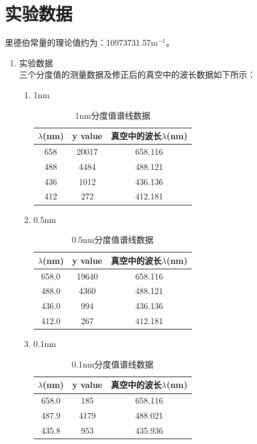 \documentclass[a4paper]{article}
\begin{document}
\section{实验数据}
里德伯常量的理论值约为：10973731.57$\text{m}^{-1}$。
\begin{enumerate}
\item 实验数据\\
三个分度值的测量数据及修正后的真空中的波长数据如下所示：
\begin{enumerate}
\item 1nm
\begin{table}[!h]
\centering
\caption{1nm分度值谱线数据}
\label{table_1nm}
\begin{tabular}{|c|c|c|}
\hline
$\lambda$(nm) & y value & 真空中的波长$\lambda$(nm) \\ \hline
658           & 20017   & 658.116 \\ \hline
488           & 4484    & 488.121 \\ \hline
436           & 1012    & 436.136 \\ \hline
412           & 272     & 412.181 \\ \hline
\end{tabular}
\end{table}
\item 0.5nm
\begin{table}[!h]
\centering
\caption{0.5nm分度值谱线数据}
\label{table_05nm}
\begin{tabular}{|c|c|c|}
\hline
$\lambda$(nm) & y value & 真空中的波长$\lambda$(nm) \\ \hline
658.0           & 19640 & 658.116   \\ \hline
488.0           & 4360  & 488.121   \\ \hline
436.0           & 994   & 436.136  \\ \hline
412.0           & 267   & 412.181   \\ \hline
\end{tabular}
\end{table}
\item 0.1nm
\begin{table}[!h]
\centering
\caption{0.1nm分度值谱线数据}
\label{table_01nm}
\begin{tabular}{|c|c|c|}
\hline
$\lambda$(nm) & y value & 真空中的波长$\lambda$(nm) \\ \hline
658.0           & 185   & 658.116  \\ \hline
487.9           & 4179  & 488.021  \\ \hline
435.8           & 953   & 435.936  \\ \hline

\end{tabular}
\end{table}
\end{enumerate}
\end{enumerate}
\end{document}

